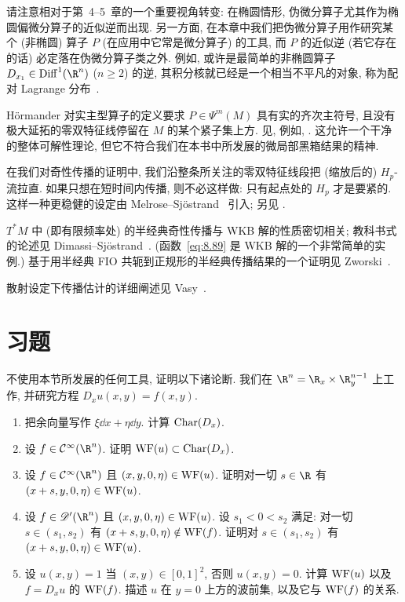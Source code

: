 请注意相对于第~4--5~章的一个重要视角转变: 在椭圆情形, 伪微分算子尤其作为椭圆偏微分算子的近似逆而出现. 另一方面, 在本章中我们把伪微分算子用作研究某个 (非椭圆) 算子 $P$ (在应用中它常是微分算子) 的工具, 而 $P$ 的近似逆 (若它存在的话) 必定落在伪微分算子类之外. 例如, 或许是最简单的非椭圆算子 $D_{x_1} \in \Diff^1(\R^n)$ ($n \ge 2$) 的逆, 其积分核就已经是一个相当不平凡的对象, 称为配对 Lagrange 分布~\cite{MU79}.

Hörmander 对实主型算子的定义要求 $P \in \Psi^m(M)$ 具有实的齐次主符号, 且没有极大延拓的零双特征线停留在 $M$ 的某个紧子集上方. 见, 例如, \cite[Definition 6.3.2]{DH72}. 这允许一个干净的整体可解性理论, 但它不符合我们在本书中所发展的微局部黑箱结果的精神.

在我们对奇性传播的证明中, 我们沿整条所关注的零双特征线段把 (缩放后的) $H_p$-流拉直. 如果只想在短时间内传播, 则不必这样做: 只有起点处的 $H_p$ 才是要紧的. 这样一种更稳健的设定由 Melrose--Sjöstrand~\cite{MS78, MS82} 引入; 另见 \cite[§2]{dHUV15}.

$T^*M$ 中 (即有限频率处) 的半经典奇性传播与 WKB 解的性质密切相关; 教科书式的论述见 Dimassi--Sjöstrand~\cite[Chapters 1 and 2]{DS99}. (函数~\eqref{eq:8.89} 是 WKB 解的一个非常简单的实例.) 基于用半经典 FIO 共轭到正规形的半经典传播结果的一个证明见 Zworski~\cite[Chapter 12.3]{Zwo12}.

散射设定下传播估计的详细阐述见 Vasy~\cite{Vas18}.

\section*{习题}

\begin{exer}[动手做奇性传播]\label{ex:8.1}
不使用本节所发展的任何工具, 证明以下诸论断. 我们在 $\R^n = \R_x \times \R_y^{n-1}$ 上工作, 并研究方程 $D_x u(x, y) = f(x, y)$.
\begin{enumerate}
    \item 把余向量写作 $\xi \dd x + \eta \dd y$. 计算 $\operatorname{Char}(D_x)$.
    \item 设 $f \in \Smooth(\R^n)$. 证明 $\operatorname{WF}(u) \subset \operatorname{Char}(D_x)$.
    \item 设 $f \in \Smooth(\R^n)$ 且 $(x, y, 0, \eta) \in \operatorname{WF}(u)$. 证明对一切 $s \in \R$ 有 $(x + s, y, 0, \eta) \in \operatorname{WF}(u)$.
    \item 设 $f \in \Distr(\R^n)$ 且 $(x, y, 0, \eta) \in \operatorname{WF}(u)$. 设 $s_1 < 0 < s_2$ 满足: 对一切 $s \in (s_1, s_2)$ 有 $(x + s, y, 0, \eta) \notin \operatorname{WF}(f)$. 证明对 $s \in (s_1, s_2)$ 有 $(x + s, y, 0, \eta) \in \operatorname{WF}(u)$.
    \item 设 $u(x, y) = 1$ 当 $(x, y) \in [0, 1]^2$, 否则 $u(x, y) = 0$. 计算 $\operatorname{WF}(u)$ 以及 $f = D_x u$ 的 $\operatorname{WF}(f)$. 描述 $u$ 在 $y = 0$ 上方的波前集, 以及它与 $\operatorname{WF}(f)$ 的关系.
\end{enumerate}
\end{exer}

